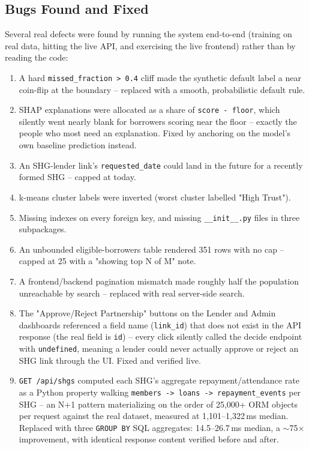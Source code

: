 \documentclass[11pt,a4paper]{article}
\begin{document}
\subsection{Bugs Found and Fixed}
\label{sec:bugs}
Several real defects were found by running the system end-to-end
(training on real data, hitting the live API, and exercising the live
frontend) rather than by reading the code:
\begin{enumerate}[leftmargin=0.7cm]
    \item A hard \texttt{missed\_fraction > 0.4} cliff made the
    synthetic default label a near coin-flip at the boundary --
    replaced with a smooth, probabilistic default rule.
    \item SHAP explanations were allocated as a share of
    \texttt{score - floor}, which silently went nearly blank for
    borrowers scoring near the floor -- exactly the people who most
    need an explanation. Fixed by anchoring on the model's own baseline
    prediction instead.
    \item An SHG-lender link's \texttt{requested\_date} could land in
    the future for a recently formed SHG -- capped at today.
    \item k-means cluster labels were inverted (worst cluster labelled
    "High Trust").
    \item Missing indexes on every foreign key, and missing
    \texttt{\_\_init\_\_.py} files in three subpackages.
    \item An unbounded eligible-borrowers table rendered 351 rows with
    no cap -- capped at 25 with a "showing top N of M" note.
    \item A frontend/backend pagination mismatch made roughly half the
    population unreachable by search -- replaced with real server-side
    search.
    \item The "Approve/Reject Partnership" buttons on the Lender and
    Admin dashboards referenced a field name (\texttt{link\_id}) that
    does not exist in the API response (the real field is \texttt{id})
    -- every click silently called the decide endpoint with
    \texttt{undefined}, meaning a lender could never actually approve
    or reject an SHG link through the UI. Fixed and verified live.
    \item \texttt{GET /api/shgs} computed each SHG's aggregate
    repayment/attendance rate as a Python property walking
    \texttt{members -> loans -> repayment\_events} per SHG -- an N+1
    pattern materializing on the order of 25{,}000+ ORM objects per
    request against the real dataset, measured at 1{,}101--1{,}322\,ms
    median. Replaced with three \texttt{GROUP BY} SQL aggregates:
    14.5--26.7\,ms median, a $\sim$75$\times$ improvement, with
    identical response content verified before and after.
\end{enumerate}
\end{document}
